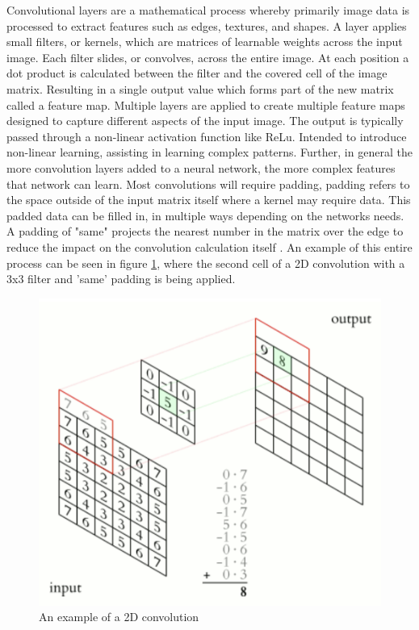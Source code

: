 \documentclass[10pt,twocolumn,letterpaper]{article}
\begin{document}
Convolutional layers are a mathematical process whereby primarily image data is processed to extract features such as edges, textures, and shapes. A layer applies small filters, or kernels, which are matrices of learnable weights across the input image. Each filter slides, or convolves, across the entire image. At each position a dot product is calculated between the filter and the covered cell of the image matrix. Resulting in a single output value which forms part of the new matrix called a feature map. Multiple layers are applied to create multiple feature maps designed to capture different aspects of the input image. The output is typically passed through a non-linear activation function like ReLu. Intended to introduce non-linear learning, assisting in learning complex patterns. Further, in general the more convolution layers added to a neural network, the more complex features that network can learn. Most convolutions will require padding, padding refers to the space outside of the input matrix itself where a kernel may require data. This padded  data can be filled in, in multiple ways depending on the networks needs. A padding of "same" projects the nearest number in the matrix over the edge to reduce the impact on the convolution calculation itself \cite{convolutiontheory}. An example of this entire process can be seen in figure \ref{fig:Convolution example}, where the second cell of a 2D convolution with a 3x3 filter and 'same' padding is being applied. 

\begin{figure} [h]
    \centering
    \includegraphics[width=\linewidth]{convolution.png}
    \caption{An example of a 2D convolution \cite{convolutiondiagram}}
    \label{fig:Convolution example}
\end{figure}
\end{document}
